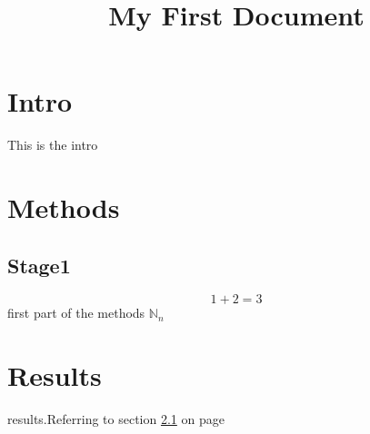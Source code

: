 \documentclass[a4paper,12pt]{article}
\begin{document}
\title{My First Document}
\date{}
\maketitle
\section{Intro}
This is the intro

\section{Methods}

\subsection{Stage1}
\label{sec1}
\begin{equation}1+2=3\end{equation}
first part of the methods
$\mathbb{N}_n$
\section{Results}
results.Referring to section \ref{sec1} on page \pageref{sec1}
\end{document}
